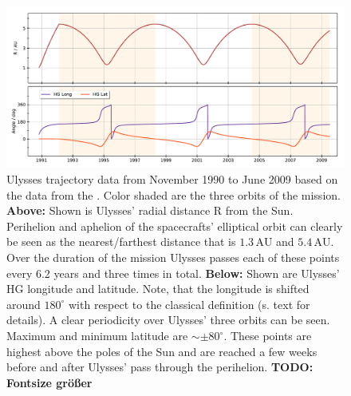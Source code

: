 \begin{figure}[h]
	\includegraphics[width=1\textwidth]{Figures/HG_coord.pdf}
	\centering
	\caption{Ulysses trajectory data from November 1990 to June 2009 based on the data from the \citet{ulysses-data-archive}. Color shaded are the three orbits of the mission. \textbf{Above:} Shown is Ulysses' radial distance R from the Sun. Perihelion and aphelion of the spacecrafts' elliptical orbit can clearly be seen as the nearest/farthest distance that is $1.3\,\mathrm{AU}$ and $5.4\,\mathrm{AU}$. Over the duration of the mission Ulysses passes each of these points every 6.2 years and three times in total. \textbf{Below:} Shown are Ulysses' HG longitude and latitude. Note, that the longitude is shifted around $180^\circ$ with respect to the classical definition (s. text for details). A clear periodicity over Ulysses' three orbits can be seen. Maximum and minimum latitude are $\sim \pm 80^\circ$. These points are highest above the poles of the Sun and are reached a few weeks before and after Ulysses' pass through the perihelion. \textbf{TODO: Fontsize größer}}
	\label{fig:traj}
\end{figure}

